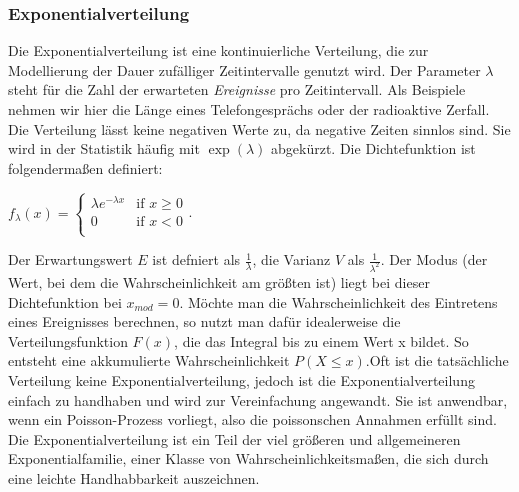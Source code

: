 \documentclass[letterpaper, titlepage]{article}
\begin{document}
\subsubsection{Exponentialverteilung}\label{Exponentialverteilung}
Die Exponentialverteilung ist eine kontinuierliche Verteilung, die zur Modellierung der Dauer zufälliger Zeitintervalle genutzt wird. Der Parameter $\lambda$ steht für die Zahl der erwarteten \textit{Ereignisse} pro Zeitintervall. Als Beispiele nehmen wir hier die Länge eines Telefongesprächs oder der radioaktive Zerfall. Die Verteilung lässt keine negativen Werte zu, da negative Zeiten sinnlos sind. Sie wird in der Statistik häufig mit $\exp(\lambda)$ abgekürzt. Die Dichtefunktion ist folgendermaßen definiert:
\begin{flushleft}
        $f_{\lambda}(x) =
        \begin{cases}
            \lambda e^{-\lambda x} & \text{if } x \geq 0 \\
            0 & \text{if } x < 0 \\
        \end{cases}$.      
\end{flushleft} 
Der Erwartungswert $E$ ist defniert als $\frac{1}{\lambda}$, die Varianz $V$ als $\frac{1}{\lambda^2}$. Der Modus (der Wert, bei dem die Wahrscheinlichkeit am größten ist) liegt bei dieser Dichtefunktion bei $x_{mod}=0$. Möchte man die Wahrscheinlichkeit des Eintretens eines Ereignisses berechnen, so nutzt man dafür idealerweise die Verteilungsfunktion $F(x)$, die das Integral bis zu einem Wert x bildet. So entsteht eine akkumulierte Wahrscheinlichkeit $P(X\leq x)$.Oft ist die tatsächliche Verteilung keine Exponentialverteilung, jedoch ist die Exponentialverteilung einfach zu handhaben und wird zur Vereinfachung angewandt. Sie ist anwendbar, wenn ein Poisson-Prozess vorliegt, also die poissonschen Annahmen erfüllt sind. Die Exponentialverteilung ist ein Teil der viel größeren und allgemeineren Exponentialfamilie, einer Klasse von Wahrscheinlichkeitsmaßen, die sich durch eine leichte Handhabbarkeit auszeichnen.    

\vspace{0.35cm}
\end{document}
